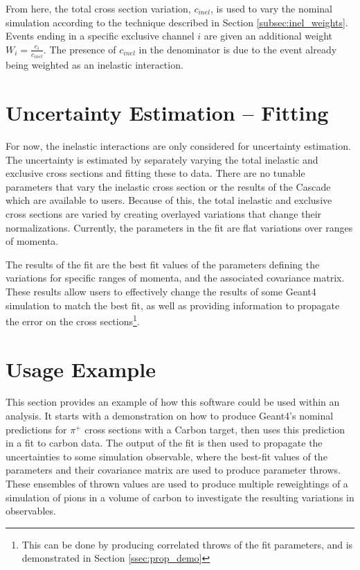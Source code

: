 \documentclass[12pt]{article}
\begin{document}
From here, the total cross section variation, $c_{inel}$, is used to vary the nominal simulation according to the technique described in Section \ref{subsec:inel_weights}. Events ending in a specific exclusive channel $i$ are given an additional weight $W_{i} = \frac{c_i}{c_{inel}}$. The presence of $c_{inel}$ in the denominator is due to the event already being weighted as an inelastic interaction. 

\section{Uncertainty Estimation -- Fitting}
For now, the inelastic interactions are only considered for uncertainty estimation. The uncertainty is estimated by separately varying the total inelastic and exclusive cross sections and fitting these to data. There are no tunable parameters that vary the inelastic cross section or the results of the Cascade which are available to users. Because of this, the total inelastic and exclusive cross sections are varied by creating overlayed variations that change their normalizations. Currently, the parameters in the fit are flat variations over ranges of momenta.

The results of the fit are the best fit values of the parameters defining the variations for specific ranges of momenta, and the associated covariance matrix. These results allow users to effectively change the results of some Geant4 simulation to match the best fit, as well as providing information to propagate the error on the cross sections\footnote{This can be done by producing correlated throws of the fit parameters, and is demonstrated in Section \ref{ssec:prop_demo}}.

\section{Usage Example}\label{sec:Demo}
This section provides an example of how this software could be used within an analysis. It starts with a demonstration on how to produce Geant4's nominal predictions for $\pi^+$ cross sections with a Carbon target, then uses this prediction in a fit to carbon data. The output of the fit is then used to propagate the uncertainties to some simulation observable, where the best-fit values of the parameters and their covariance matrix are used to produce parameter throws. These ensembles of thrown values are used to produce multiple reweightings of a simulation of pions in a volume of carbon to investigate the resulting variations in observables.
\end{document}
